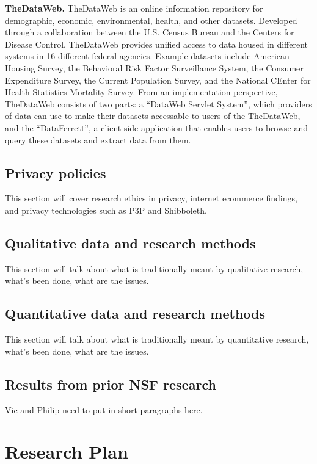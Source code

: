 {\bf TheDataWeb.} TheDataWeb is an online information repository for
demographic, economic, environmental, health, and other datasets.
Developed through a collaboration between the U.S. Census Bureau and the
Centers for Disease Control, TheDataWeb provides unified access to data
housed in different systems in 16 different federal agencies. Example
datasets include American Housing Survey, the Behavioral Risk Factor
Surveillance System, the Consumer Expenditure Survey, the Current
Population Survey, and the National CEnter for Health Statistics Mortality
Survey.  From an implementation perspective, TheDataWeb consists of two
parts: a ``DataWeb Servlet System'', which providers of data can use to
make their datasets accessable to users of the TheDataWeb, and the
``DataFerrett'', a client-side application that enables users to browse and
query these datasets and extract data from them.



\subsection{Privacy policies}

This section will cover research ethics in privacy, internet ecommerce findings, and privacy technologies 
such as P3P and Shibboleth.

\subsection{Qualitative data and research methods}

This section will talk about what is traditionally meant by qualitative research, what's been done, what 
are the issues.

\subsection{Quantitative data and research methods}

This section will talk about what is traditionally meant by quantitative research, what's been done, what 
are the issues.

\subsection{Results from prior NSF research}

Vic and Philip need to put in short paragraphs here. 


\section{Research Plan}

